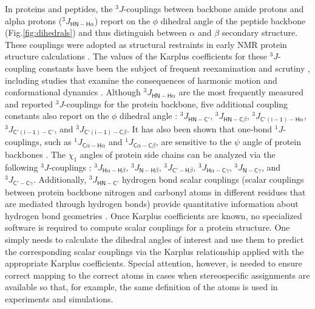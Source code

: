 \documentclass[9pt,review,pubversion]{livecoms}
\begin{document}
In proteins and peptides, the $^3J$-couplings between backbone amide protons and alpha protons ($^3J_{\mathsf{HN-H\alpha}}$) report on the $\phi$ dihedral angle of the peptide backbone (Fig.\ref{fig:dihedrals}) and thus distinguish between $\alpha$ and $\beta$ secondary structure.
These couplings were adopted as structural restraints in early NMR protein structure calculations \cite{pardi_calibration_1984}.
The values of the Karplus coefficients for these $^3J$-coupling constants have been the subject of frequent reexamination and scrutiny \cite{case_static_2000,lindorff-larsen_interpreting_2005,altona_vicinal_2007,vogeli_limits_2007,wang_quantum_2013,lee_quantitative_2015,li_high_2015}, including studies that examine the consequences of harmonic motion and conformational dynamics \cite{brueschweiler_adding_1994,case_static_2000,lindorff-larsen_interpreting_2005,vogeli_limits_2007,lee_quantitative_2015}.
Although $^3J_{\mathsf{HN-H\alpha}}$ are the most frequently measured and reported $^3J$-couplings for the protein backbone, five additional coupling constants also report on the $\phi$ dihedral angle \cite{schmidt_self-consistent_1999}: $^3J_{\mathsf{HN-C'}}$, $^3J_{\mathsf{HN-C\beta}}$, $^3J_{\mathsf{C'(i-1)-H\alpha}}$, $^3J_{\mathsf{C'(i-1)-C'}}$, and $^3J_{\mathsf{C'(i-1)-C\beta}}$.
It has also been shown that one-bond $^1J$-couplings, such as $^1J_{\mathsf{C\alpha-H\alpha}}$ and $^1J_{\mathsf{C\alpha-C\beta}}$, are sensitive to the $\psi$ angle of protein backbones \cite{vuister_use_1993,cornilescu_large_2000,gapsys_improved_2015}.
The $\chi_1$ angles of protein side chains can be analyzed via the following $^3J$-couplings \cite{perez_self-consistent_2001,chou_insights_2003}: $^3J_{\mathsf{H\alpha-H\beta}}$, $^3J_{\mathsf{N-H\beta}}$, $^3J_{\mathsf{C'-H\beta}}$, $^3J_{\mathsf{H\alpha-C\gamma}}$, $^3J_{\mathsf{N-C\gamma}}$, and $^3J_{\mathsf{C'-C\gamma}}$.
Additionally, $^3J_{\mathsf{HN-C'}}$ hydrogen bond scalar couplings (scalar couplings between protein backbone nitrogen and carbonyl atoms in different residues that are mediated through hydrogen bonds) provide quantitative information about hydrogen bond geometries \cite{barfield_structural_2002}.
Once Karplus coefficients are known, no specialized software is required to compute scalar couplings for a protein structure.
One simply needs to calculate the dihedral angles of interest and use them to predict the corresponding scalar couplings via the Karplus relationship applied with the appropriate Karplus coefficients.
Special attention, however, is needed to ensure correct mapping to the correct atoms in cases when stereospecific assignments are available so that, for example, the same definition of the atoms is used in experiments and simulations.
\end{document}
